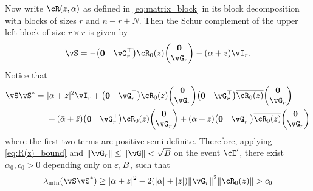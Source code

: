\begin{proof-of-lemma}
Now write $\vcR(z,\alpha)$ as defined in \eqref{eq:matrix_block} in its block
decomposition with blocks of sizes $r$ and $n-r+N$. Then the Schur complement
of the upper left block of size $r \times r$ is given by
	\begin{equation}\label{eq:schur_com}
	\vS=-\begin{pmatrix}
		\mathbf{0}&
		\vG_r^\top
	\end{pmatrix}\vcR_0(z)
	\begin{pmatrix}
		\mathbf{0}\\
		\vG_r
	\end{pmatrix}	-(\alpha+z)\vI_{r}.
	\end{equation}
	Notice that \begin{align}
	\vS\vS^*=~& |\alpha+z|^2\vI_{r}+\begin{pmatrix}
		\mathbf{0}&
		\vG_r^\top
	\end{pmatrix}\vcR_0(z)
	\begin{pmatrix}
		\mathbf{0}\\
		\vG_r
	\end{pmatrix}\begin{pmatrix}
		\mathbf{0}&
	\vG_r^\top
	\end{pmatrix}\overline{\vcR_0(z)}
	\begin{pmatrix}
		\mathbf{0}\\
		\vG_r
	\end{pmatrix}\\
	~&+(\bar \alpha+\bar z)\begin{pmatrix}
		\mathbf{0}&
		\vG_r^\top
	\end{pmatrix}\vcR_0(z)
	\begin{pmatrix}
		\mathbf{0}\\
		\vG_r
	\end{pmatrix}+ (\alpha+z)\begin{pmatrix}
		\mathbf{0}&
		\vG_r^\top
	\end{pmatrix}\overline{\vcR_0(z)}
	\begin{pmatrix}
		\mathbf{0}\\
		\vG_r
	\end{pmatrix}
	\end{align}
where the first two terms are positive semi-definite.
	Therefore, applying \eqref{eq:R(z)_bound} and $\|\vG_r\| \leq
\|\vG\|<\sqrt{B}$ on the event $\cE'$,
there exist $\alpha_0,c_0>0$ depending only on $\varepsilon,B$, such that 
	\begin{align}
	\lambda_{\min}(\vS\vS^*) \ge
|\alpha+z|^2-2(|\alpha|+|z|)\norm{\vG_r}^2\norm{\vcR_0( z)}>c_0

\end{align}
\end{proof-of-lemma}
